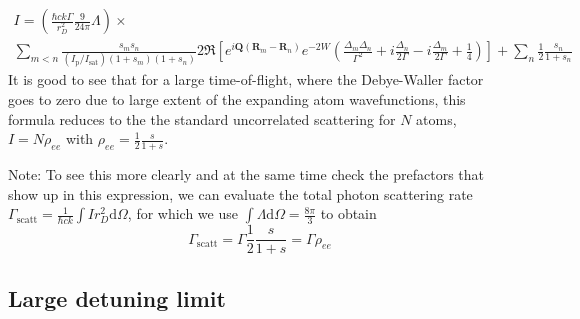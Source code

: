 \documentclass[11pt,letter]{article}
\newcommand{\bv}[1]{\ensuremath{\bm{#1}}}
\newcommand{\iisat}{\ensuremath{I_{\mathrm{p}}/I_{\mathrm{sat}}}}
\begin{document}
\begin{multline}
\label{eq:finalIdetector}
 I  =
 \left( 
 \frac{\hbar c k \Gamma}{r_{D}^{2}}  
     \frac{9}{24\pi} \Lambda 
  \right) \times \\
  \sum_{m<n} 
    \frac{ s_{m} s_{n} } 
         { (\iisat) ( 1+s_{m} )( 1+s_{n} ) }
    2 \Re\left[ 
               e^{ i \bv{Q}( \bv{R}_{m} - \bv{R}_{n} ) } e^{-2W}  
    \left(
        \frac{ \Delta_{m} \Delta_{n} }{ \Gamma^{2} } 
      + i \frac{ \Delta_{n} }{ 2 \Gamma } 
      - i \frac{ \Delta_{m} }{ 2 \Gamma } 
      + \frac{1}{4}  
    \right) \right]  
  + \sum_{n}  \frac{1}{2}
    \frac{ s_{n} } { 1 + s_{n} } 
\end{multline}
It is good to see that for a large time-of-flight, where the Debye-Waller
factor goes to zero due to large extent of the expanding atom wavefunctions,
this formula reduces to the the standard uncorrelated scattering for $N$ atoms,
$I=N\rho_{ee}$ with $\rho_{ee} = \frac{1}{2} \frac{s}{1+s}$.  

{\small Note:  To see this more clearly and at the same time check the
prefactors that show up in this expression, we can evaluate the total photon
scattering rate  $\Gamma_{\mathrm{scatt}}= \frac{1}{\hbar c k}\int I r_{D}^{2}
\mathrm{d}\Omega $,  for which we use $\int \Lambda \mathrm{d} \Omega =
\frac{8\pi}{3}$ to obtain
\begin{equation}
\Gamma_{\mathrm{scatt}} =  \Gamma \frac{1}{2} \frac{s}{1+s} = \Gamma \rho_{ee}
\end{equation} 
 
}


\subsection{ Large detuning limit} 
\end{document}
